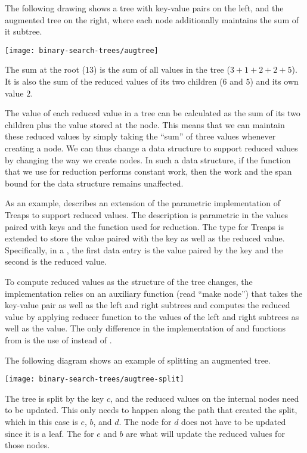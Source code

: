 \begin{example}
  The following drawing shows a tree with key-value pairs on the left,
  and the augmented tree on the right, where each node additionally
  maintains the sum of it subtree.
\begin{center}
  \texttt{[image: binary-search-trees/augtree]}
\end{center}
The sum at the root ($13$) is the sum of all values in the tree ($3 +
1 + 2 + 2 + 5$).    It is also the sum of the reduced values of its
two children ($6$ and $5$) and its own value $2$.
\end{example}







The value of each reduced value in a tree can be calculated as the sum
of its two children plus the value stored at the node.  This means
that we can maintain these reduced values by simply taking the
``sum'' of three values whenever creating a node.  We can thus change
a data structure to support reduced values by changing the way we
create nodes.  In such a data structure, if the function that we use
for reduction performs constant work, then the work and the span bound
for the data structure remains unaffected.

As an example,  describes an extension of the
parametric implementation of Treaps to support reduced values.  The
description is parametric in the values paired with keys and the
function  used for reduction.  
%
The type for Treaps is extended to store the value paired with the key
as well as the reduced value.  Specifically, in a , the
first data entry is the value paired by the key and the second is the
reduced value.
%


To compute reduced values as the structure of the tree changes, the
implementation relies on an auxiliary function  (read
``make node'') that takes the key-value pair as well as the left and
right subtrees and computes the reduced value by applying reducer
function to the values of the left and right subtrees as well as the
value.
%
The only difference in the implementation of  and
 functions from  is the use of 
instead of .  

\begin{example}
The following diagram shows an example of splitting an augmented tree.
\begin{center}
  \texttt{[image: binary-search-trees/augtree-split]}
\end{center}
The tree is split by the key $c$, and the reduced values on the
internal nodes need to be updated.  This only needs to happen along
the path that created the split, which in this case is $e$, $b$, and
$d$.  The node for $d$ does not have to be updated since it is a leaf.
The  for $e$ and $b$ are what will update the reduced
values for those nodes.
\end{example}

